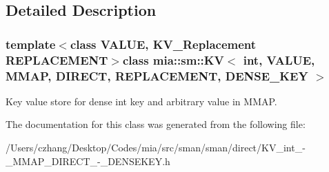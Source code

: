 \subsection{Detailed Description}
\subsubsection*{template$<$class V\-A\-L\-U\-E, K\-V\-\_\-\-Replacement R\-E\-P\-L\-A\-C\-E\-M\-E\-N\-T$>$class mia\-::sm\-::\-K\-V$<$ int, V\-A\-L\-U\-E, M\-M\-A\-P, D\-I\-R\-E\-C\-T, R\-E\-P\-L\-A\-C\-E\-M\-E\-N\-T, D\-E\-N\-S\-E\-\_\-\-K\-E\-Y $>$}

Key value store for dense int key and arbitrary value in M\-M\-A\-P. 

The documentation for this class was generated from the following file\-:\begin{DoxyCompactItemize}
\item 
/\-Users/czhang/\-Desktop/\-Codes/mia/src/sman/sman/direct/K\-V\-\_\-int\-\_\--\/\-\_\-\-M\-M\-A\-P\-\_\-\-D\-I\-R\-E\-C\-T\-\_\--\/\-\_\-\-D\-E\-N\-S\-E\-K\-E\-Y.\-h\end{DoxyCompactItemize}
